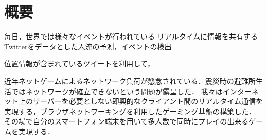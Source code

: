 \newpage
{}
\setcounter{page}{1}
\chapter*{概要}
\label{gaiyou}

毎日，世界では様々なイベントが行われている
リアルタイムに情報を共有する
Twitterをデータとした人流の予測，イベントの検出

位置情報が含まれているツイートを利用して，

近年ネットゲームによるネットワーク負荷が懸念されている．震災時の避難所生活ではネットワークが確立できないという問題が露呈した．
我々はインターネット上のサーバーを必要としない即興的なクライアント間のリアルタイム通信を実現する，ブラウザネットワーキングを利用したゲーミング基盤の構築した．
その場で自分のスマートフォン端末を用いて多人数で同時にプレイの出来るゲームを実現する．
